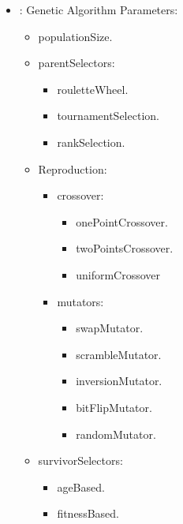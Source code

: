 \begin{itemize}
    \item {}:
      Genetic Algorithm Parameters:\begin{itemize}
      \item populationSize.                                                  \item parentSelectors:
      \begin{itemize}                                                                      \item
      rouletteWheel.                                                                      \item
      tournamentSelection.
      \item rankSelection.
      \end{itemize}                                                 \item Reproduction:
      \begin{itemize}                                                                    \item
      crossover:
      \begin{itemize}                                                                        \item
      onePointCrossover.
      \item twoPointsCrossover.
      \item uniformCrossover
      \end{itemize}                                                                    \item
      mutators:                                                                      \begin{itemize}
      \item swapMutator.
      \item scrambleMutator.
      \item inversionMutator.
      \item bitFlipMutator.
      \item randomMutator.
      \end{itemize}                                                                    \end{itemize}
      \item survivorSelectors:
      \begin{itemize}                                                                        \item
      ageBased.                                                                        \item
      fitnessBased.
      \end{itemize}                                                \end{itemize}


\end{itemize}
